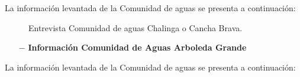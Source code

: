\documentclass[]{article}
\begin{document}
La información levantada de la Comunidad de aguas se presenta a continuación:

\begin{figure} [H]
	\caption{Entrevista Comunidad de aguas Chalinga o Cancha Brava.}
\end{figure}

\begin{itemize}
	\item[$-$] \textbf{Información Comunidad de Aguas Arboleda Grande}
\end{itemize}

La información levantada de la Comunidad de aguas se presenta a continuación:
\end{document}
